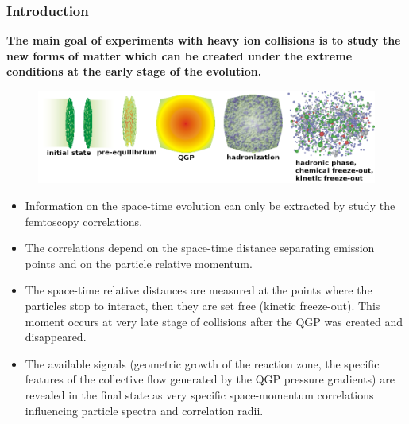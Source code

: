 \documentclass[dvipsnames] {beamer}
\begin{document}
\begin{frame}
  \frametitle{Introduction}
  \begin{block}{}
    \tiny{ \bf
      The main goal of experiments with heavy ion collisions is to study the new forms of matter which can be created under the extreme
      conditions at the early stage of the evolution.
    }
  \end{block}
  \begin{block}{}
    \begin{figure}[H]
      \includegraphics[width=0.8\linewidth]{corr_femto3.png}
    \end{figure}
  \end{block}
  \begin{block}{}
    \tiny{ \bf
    \begin{itemize}
    \item Information on the space-time evolution can only be extracted by study the femtoscopy correlations.
    \item The correlations depend on the space-time distance separating emission points and on the particle relative momentum.
    \item The space-time relative distances are measured at the points where the particles stop to interact, then they are set
      free (kinetic freeze-out). This moment occurs at very late stage of collisions after the QGP was created and disappeared.
    \item The available signals (geometric growth of the reaction zone, the specific features of the collective flow generated by the
      QGP pressure gradients) are revealed in the final state as very specific space-momentum correlations influencing particle spectra
      and correlation radii.
    \end{itemize}
    }
  \end{block}
\end{frame}
\end{document}

